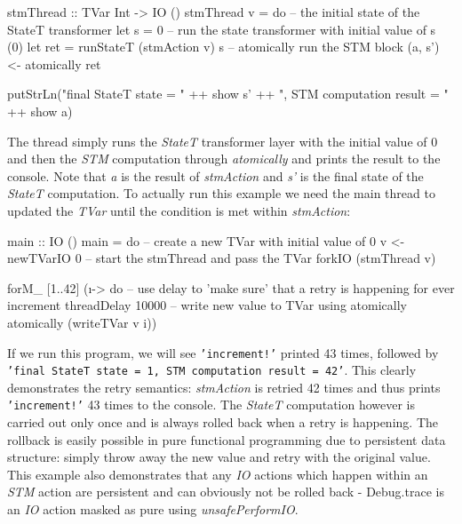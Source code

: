 \begin{HaskellCode}
stmThread :: TVar Int -> IO ()
stmThread v = do
  -- the initial state of the StateT transformer
  let s = 0
  -- run the state transformer with initial value of s (0)
  let ret = runStateT (stmAction v) s
  -- atomically run the STM block
  (a, s') <- atomically ret
  
  putStrLn("final StateT state     = " ++ show s' ++
           ", STM computation result = " ++ show a)
\end{HaskellCode}

The thread simply runs the \textit{StateT} transformer layer with the initial value of 0 and then the \textit{STM} computation through \textit{atomically} and prints the result to the console. Note that \textit{a} is the result of \textit{stmAction} and \textit{s'} is the final state of the \textit{StateT} computation. To actually run this example we need the main thread to updated the \textit{TVar} until the condition is met within \textit{stmAction}:

\begin{HaskellCode}
main :: IO ()
main = do
  -- create a new TVar with initial value of 0
  v <- newTVarIO 0 
  -- start the stmThread and pass the TVar
  forkIO (stmThread v)

  forM_ [1..42] (\i -> do
    -- use delay to 'make sure' that a retry is happening for ever increment
    threadDelay 10000
    -- write new value to TVar using atomically
    atomically (writeTVar v i))
\end{HaskellCode}

If we run this program, we will see \texttt{'increment!'} printed 43 times, followed by \texttt{'final StateT state = 1, STM computation result = 42'}. This clearly demonstrates the retry semantics: \textit{stmAction} is retried 42 times and thus prints \texttt{'increment!'} 43 times to the console. The \textit{StateT} computation however is carried out only once and is always rolled back when a retry is happening. The rollback is easily possible in pure functional programming due to persistent data structure: simply throw away the new value and retry with the original value. This example also demonstrates that any \textit{IO} actions which happen within an \textit{STM} action are persistent and can obviously not be rolled back - Debug.trace is an \textit{IO} action masked as pure using \textit{unsafePerformIO}.